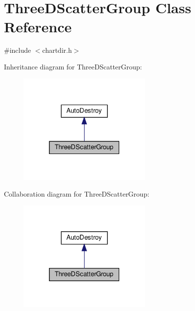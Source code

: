 \hypertarget{class_three_d_scatter_group}{}\section{Three\+D\+Scatter\+Group Class Reference}
\label{class_three_d_scatter_group}


{\ttfamily \#include $<$chartdir.\+h$>$}



Inheritance diagram for Three\+D\+Scatter\+Group\+:
\nopagebreak
\begin{figure}[H]
\begin{center}
\leavevmode
\includegraphics[width=187pt]{class_three_d_scatter_group__inherit__graph}
\end{center}
\end{figure}


Collaboration diagram for Three\+D\+Scatter\+Group\+:
\nopagebreak
\begin{figure}[H]
\begin{center}
\leavevmode
\includegraphics[width=187pt]{class_three_d_scatter_group__coll__graph}
\end{center}
\end{figure}
